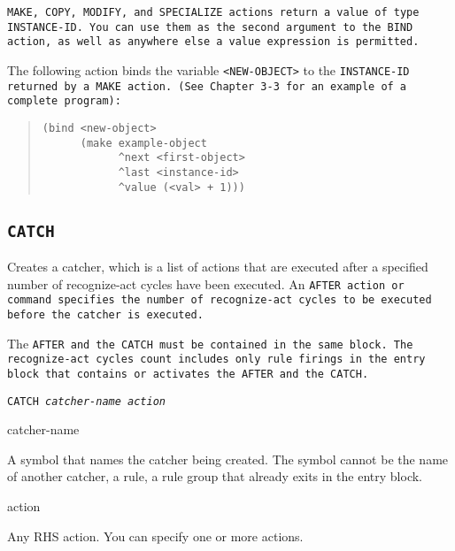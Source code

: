 \begin{note}
  \tt{MAKE}, \tt{COPY}, \tt{MODIFY}, and \tt{SPECIALIZE} actions
  return a value of type \tt{INSTANCE-ID}. You can use them as the
  second argument to the \tt{BIND} action, as well as anywhere else a
  value expression is permitted.
\end{note}

\Example

The following action binds the variable \verb|<NEW-OBJECT>| to the
\tt{INSTANCE-ID} returned by a \tt{MAKE} action. (See Chapter 3-3 for
an example of a complete program):

\begin{quote}
\begin{verbatim}
(bind <new-object>
      (make example-object 
            ^next <first-object> 
            ^last <instance-id>
            ^value (<val> + 1)))
\end{verbatim}
\end{quote}         

\subsection{\tt{CATCH}}

Creates a catcher, which is a list of actions that are executed after
a specified number of recognize-act cycles have been executed. An
\tt{AFTER} action or command specifies the number of recognize-act
cycles to be executed before the catcher is executed.

The \tt{AFTER} and the \tt{CATCH} must be contained in the same
block. The recognize-act cycles count includes only rule firings in
the entry block that contains or activates the \tt{AFTER} and the
\tt{CATCH}.

\Format

\tt{CATCH} \it{catcher-name} \it{action}

\begin{arguments}
\item[catcher-name]

  A symbol that names the catcher being created. The symbol cannot be
  the name of another catcher, a rule, a rule group that already exits
  in the entry block.

\item[action]

  Any RHS action. You can specify one or more actions.
\end{arguments}

\Example

